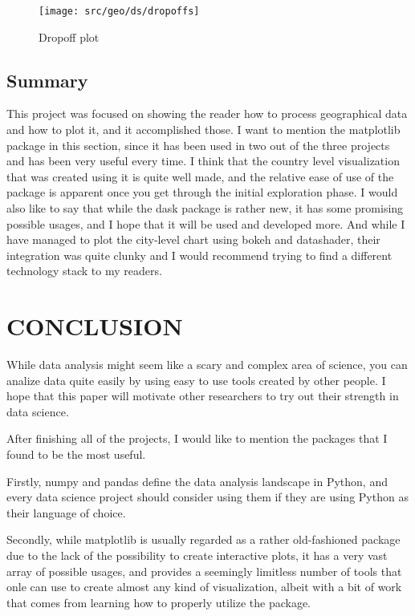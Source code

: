 \documentclass[12pt, a4paper]{article}
\begin{document}
\begin{figure}[H]
    \centering
    \texttt{[image: src/geo/ds/dropoffs]}
    \caption{Dropoff plot}
    \label{fig:geods_dropoff}
\end{figure}



\subsection{Summary}

This project was focused on showing the reader how to process geographical data and how to plot it, and it accomplished those. I want to mention the matplotlib package in this section, since it has been used in two out of the three projects and has been very useful every time. I think that the country level visualization that was created using it is quite well made, and the relative ease of use of the package is apparent once you get through the initial exploration phase.
I would also like to say that while the dask package is rather new, it has some promising possible usages, and I hope that it will be used and developed more. And while I have managed to plot the city-level chart using bokeh and datashader, their integration was quite clunky and I would recommend trying to find a different technology stack to my readers.


\newpage
\section{CONCLUSION}

While data analysis might seem like a scary and complex area of science, you can analize data quite easily by using easy to use tools created by other people. I hope that this paper will motivate other researchers to try out their strength in data science.

After finishing all of the projects, I would like to mention the packages that I found to be the most useful.

Firstly, numpy and pandas define the data analysis landscape in Python, and every data science project should consider using them if they are using Python as their language of choice.

Secondly, while matplotlib is usually regarded as a rather old-fashioned package due to the lack of the possibility to create interactive plots, it has a very vast array of possible usages, and provides a seemingly limitless number of tools that onle can use to create almost any kind of visualization, albeit with a bit of work that comes from learning how to properly utilize the package.
\end{document}
